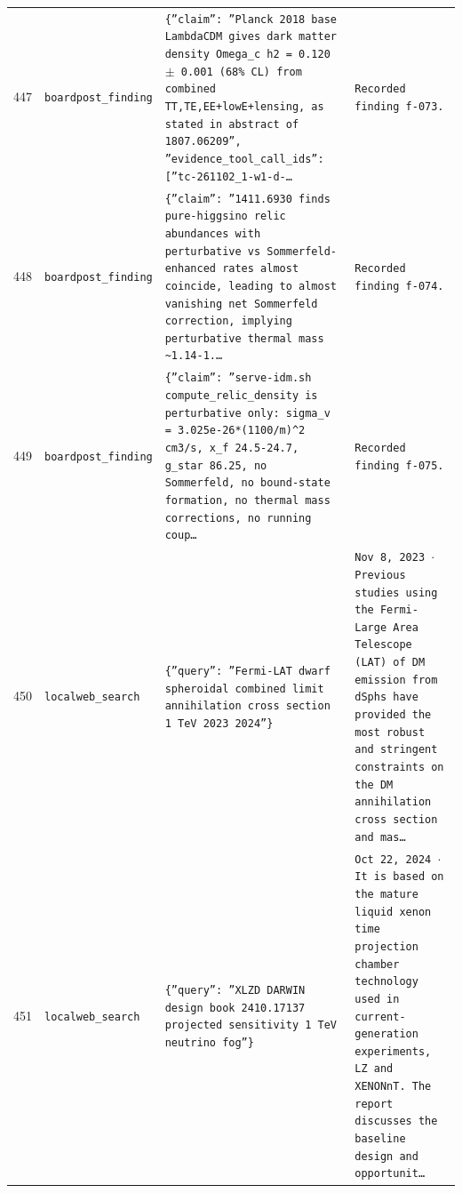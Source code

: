\documentclass[11pt,a4paper]{article}
\begin{document}
\begin{longtable}{@{}p{}p{}p{}p{}@{}}
447 & \texttt{board}\newline\texttt{post\_\allowbreak{}finding} & \texttt{\{''claim'':\allowbreak{} ''Planck 2018 base LambdaCDM gives dark matter density Omega\_\allowbreak{}c h2 =\allowbreak{} 0.120 $\pm$ 0.001 (68\% CL)\allowbreak{} from combined TT,\allowbreak{}TE,\allowbreak{}EE+lowE+lensing,\allowbreak{} as stated in abstract of 1807.06209'',\allowbreak{} ''evidence\_\allowbreak{}tool\_\allowbreak{}call\_\allowbreak{}ids'':\allowbreak{} [''tc-261102\_\allowbreak{}1-w1-d-\ldots{}\allowbreak{}} & \texttt{Recorded finding f-073.} \\
448 & \texttt{board}\newline\texttt{post\_\allowbreak{}finding} & \texttt{\{''claim'':\allowbreak{} ''1411.6930 finds pure-higgsino relic abundances with perturbative vs Sommerfeld-enhanced rates almost coincide,\allowbreak{} leading to almost vanishing net Sommerfeld correction,\allowbreak{} implying perturbative thermal mass \textasciitilde{}\allowbreak{}1.14-1.\ldots{}\allowbreak{}} & \texttt{Recorded finding f-074.} \\
449 & \texttt{board}\newline\texttt{post\_\allowbreak{}finding} & \texttt{\{''claim'':\allowbreak{} ''serve-idm.sh compute\_\allowbreak{}relic\_\allowbreak{}density is perturbative only:\allowbreak{} sigma\_\allowbreak{}v =\allowbreak{} 3.025e-26*(1100/\allowbreak{}m)\allowbreak{}\textasciicircum{}\allowbreak{}2 cm3/\allowbreak{}s,\allowbreak{} x\_\allowbreak{}f 24.5-24.7,\allowbreak{} g\_\allowbreak{}star 86.25,\allowbreak{} no Sommerfeld,\allowbreak{} no bound-state formation,\allowbreak{} no thermal mass corrections,\allowbreak{} no running coup\ldots{}\allowbreak{}} & \texttt{Recorded finding f-075.} \\
450 & \texttt{local}\newline\texttt{web\_\allowbreak{}search} & \texttt{\{''query'':\allowbreak{} ''Fermi-LAT dwarf spheroidal combined limit annihilation cross section 1 TeV 2023 2024''\}\allowbreak{}} & \texttt{Nov 8,\allowbreak{} 2023 $\cdot$ Previous studies using the Fermi-Large Area Telescope (LAT)\allowbreak{} of DM emission from dSphs have provided the most robust and stringent constraints on the DM annihilation cross section and mas\ldots{}\allowbreak{}} \\
451 & \texttt{local}\newline\texttt{web\_\allowbreak{}search} & \texttt{\{''query'':\allowbreak{} ''XLZD DARWIN design book 2410.17137 projected sensitivity 1 TeV neutrino fog''\}\allowbreak{}} & \texttt{Oct 22,\allowbreak{} 2024 $\cdot$ It is based on the mature liquid xenon time projection chamber technology used in current-generation experiments,\allowbreak{} LZ and XENONnT. The report discusses the baseline design and opportunit\ldots{}\allowbreak{}} \\

\end{longtable}
\end{document}
